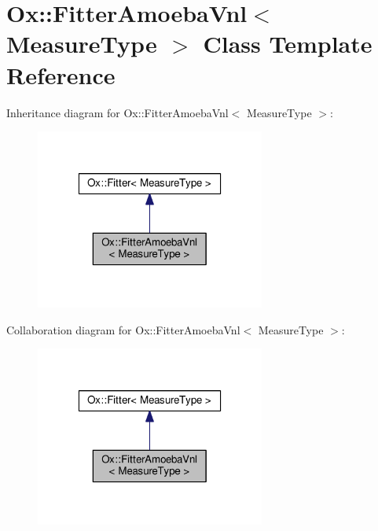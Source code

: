 \hypertarget{class_ox_1_1_fitter_amoeba_vnl}{\section{Ox\-:\-:Fitter\-Amoeba\-Vnl$<$ Measure\-Type $>$ Class Template Reference}
\label{class_ox_1_1_fitter_amoeba_vnl}
}


Inheritance diagram for Ox\-:\-:Fitter\-Amoeba\-Vnl$<$ Measure\-Type $>$\-:
\nopagebreak
\begin{figure}[H]
\begin{center}
\leavevmode
\includegraphics[width=214pt]{class_ox_1_1_fitter_amoeba_vnl__inherit__graph}
\end{center}
\end{figure}


Collaboration diagram for Ox\-:\-:Fitter\-Amoeba\-Vnl$<$ Measure\-Type $>$\-:
\nopagebreak
\begin{figure}[H]
\begin{center}
\leavevmode
\includegraphics[width=214pt]{class_ox_1_1_fitter_amoeba_vnl__coll__graph}
\end{center}
\end{figure}
